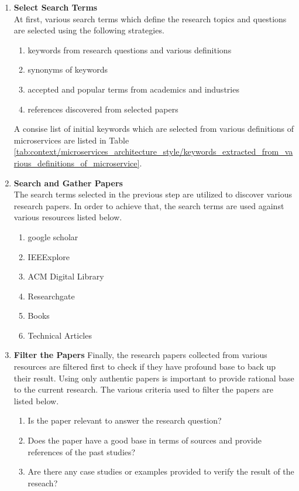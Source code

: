 \begin{enumerate}
\item \textbf{Select Search Terms}\\
At first, various search terms which define the research topics and questions are selected using the following strategies.
\begin{enumerate}
\item keywords from research questions and various definitions
\item synonyms of keywords
\item accepted and popular terms from academics and industries
\item references discovered from selected papers
\end{enumerate}
A consise list of initial keywords which are selected from various definitions of microservices are listed in Table \ref{tab:context/microservices_architecture_style/keywords_extracted_from_various_definitions_of_microservice}.
\item \textbf{Search and Gather Papers}\\
The search terms selected in the previous step are utilized to discover various research papers. In order to achieve that, the search terms are used against various resources listed below.
\begin{enumerate}
\item google scholar
\item IEEExplore
\item ACM Digital Library
\item Researchgate
\item Books
\item Technical Articles
\end{enumerate}
\item \textbf{Filter the Papers}
Finally, the research papers collected from various resources are filtered first to check if they have profound base to back up their result. Using only authentic papers is important to provide rational base to the current research. The various criteria used to filter the papers are listed below.
\begin{enumerate}
\item Is the paper relevant to answer the research question?
\item Does the paper have a good base in terms of sources and provide references of the past studies? 
\item Are there any case studies or examples provided to verify the result of the reseach?
\end{enumerate}
\end{enumerate}


